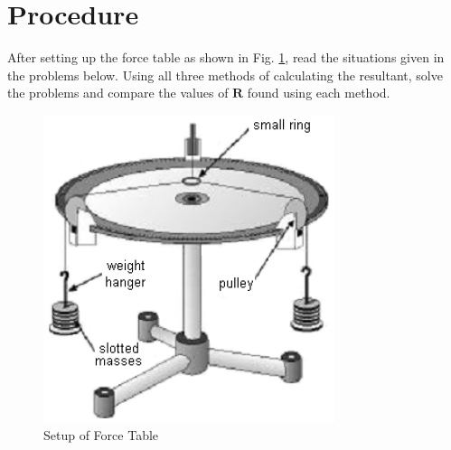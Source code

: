 \documentclass[11pt, titlepage]{article}
\begin{document}
\section*{Procedure}
After setting up the force table as shown in Fig. \ref{fig:3}, read the situations given in the problems below. Using all three methods of calculating the resultant, solve the problems and compare the values of $\mathbf{R}$ found using each method.
\begin{figure}[!ht]
\centering
\includegraphics[scale=.65, angle=0]{lab03_forcetable.png}
\caption{Setup of Force Table \label{fig:3}}
\end{figure}
\end{document}
